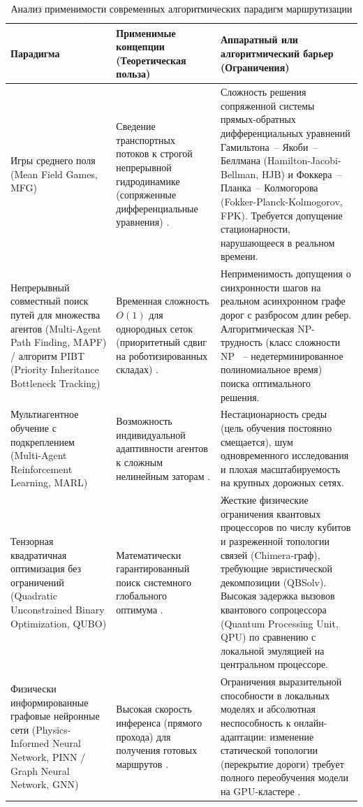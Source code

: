 \begin{table}[htbp]
\centering
\small
\renewcommand{\arraystretch}{1.2}
\caption{Анализ применимости современных алгоритмических парадигм маршрутизации}
\label{tab:paradigms_comparison}
\begin{tabularx}{\linewidth}{|p{3.5cm}|X|X|}
\hline
Парадигма & Применимые концепции (Теоретическая польза) & Аппаратный или алгоритмический барьер (Ограничения) \\ \hline
Игры среднего поля (Mean Field Games, MFG) & Сведение транспортных потоков к строгой непрерывной гидродинамике (сопряженные дифференциальные уравнения) \cite{seaports_mean_field, huang2007large}. & Сложность решения сопряженной системы прямых-обратных дифференциальных уравнений Гамильтона~-- Якоби~-- Беллмана (Hamilton-Jacobi-Bellman, HJB) и Фоккера~-- Планка~-- Колмогорова (Fokker-Planck-Kolmogorov, FPK). Требуется допущение стационарности, нарушающееся в реальном времени. \\ \hline
Непрерывный совместный поиск путей для множества агентов (Multi-Agent Path Finding, MAPF) / алгоритм PIBT (Priority Inheritance Bottleneck Tracking) & Временная сложность $O(1)$ для однородных сеток (приоритетный сдвиг на роботизированных складах) \cite{stern2019mapf, okumura2019pibt}. & Неприменимость допущения о синхронности шагов на реальном асинхронном графе дорог с разбросом длин ребер. Алгоритмическая NP-трудность (класс сложности NP ~-- недетерминированное полиномиальное время) поиска оптимального решения. \\ \hline
Мультиагентное обучение с подкреплением (Multi-Agent Reinforcement Learning, MARL) & Возможность индивидуальной адаптивности агентов к сложным нелинейным заторам \cite{hernandez2017survey}. & Нестационарность среды (цель обучения постоянно смещается), шум одновременного исследования и плохая масштабируемость на крупных дорожных сетях. \\ \hline
Тензорная квадратичная оптимизация без ограничений (Quadratic Unconstrained Binary Optimization, QUBO) & Математически гарантированный поиск системного глобального оптимума \cite{feld2019hybrid}. & Жесткие физические ограничения квантовых процессоров по числу кубитов и разреженной топологии связей (Chimera-граф), требующие эвристической декомпозиции (QBSolv). Высокая задержка вызовов квантового сопроцессора (Quantum Processing Unit, QPU) по сравнению с локальной эмуляцией на центральном процессоре. \\ \hline
Физически информированные графовые нейронные сети (Physics-Informed Neural Network, PINN / Graph Neural Network, GNN) & Высокая скорость инференса (прямого прохода) для получения готовых маршрутов \cite{luo2024stg4traffic}. & Ограничения выразительной способности в локальных моделях и абсолютная неспособность к онлайн-адаптации: изменение статической топологии (перекрытие дороги) требует полного переобучения модели на GPU-кластере \cite{garg2020generalization}. \\ \hline

\end{tabularx}
\end{table}
